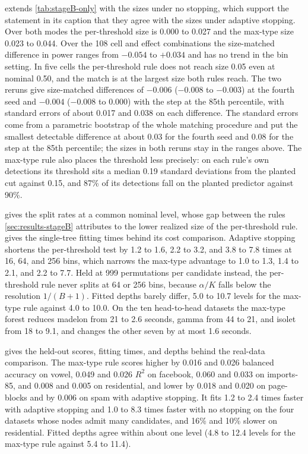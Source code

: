  extends \cref{tab:stageB-only} with the sizes under
no stopping, which support the statement in its caption that they agree with
the sizes under adaptive stopping. Over both modes the per-threshold size is
0.000 to 0.027 and the max-type size 0.023 to 0.044. Over the 108 cell and
effect combinations the size-matched difference in power ranges from $-0.054$
to $+0.034$ and has no trend in the bin setting. In five cells the
per-threshold rule does not reach size 0.05 even at nominal 0.50, and the match
is at the largest size both rules reach. The two reruns give size-matched
differences of $-0.006$ ($-0.008$ to $-0.003$) at the fourth seed and $-0.004$
($-0.008$ to $0.000$) with the step at the 85th percentile, with standard
errors of about 0.017 and 0.038 on each difference. The standard errors come
from a parametric bootstrap of the whole matching procedure and put the
smallest detectable difference at about 0.03 for the fourth seed and 0.08 for
the step at the 85th percentile; the sizes in both reruns stay in the ranges
above. The max-type rule also places the threshold less precisely: on each
rule's own detections its threshold sits a median 0.19 standard deviations
from the planted cut against 0.15, and 87\% of its detections fall on the
planted predictor against 90\%.

 gives the split rates at a common nominal level, whose
gap between the rules \cref{sec:results-stageB} attributes to the lower
realized size of the per-threshold rule.  gives the
single-tree fitting times behind its cost comparison. Adaptive stopping
shortens the per-threshold test by 1.2 to 1.6, 2.2 to 3.2, and 3.8 to 7.8
times at 16, 64, and 256 bins, which narrows the max-type advantage to 1.0 to
1.3, 1.4 to 2.1, and 2.2 to 7.7. Held at 999 permutations per candidate
instead, the per-threshold rule never splits at 64 or 256 bins, because
$\alpha/K$ falls below the resolution $1/(B+1)$. Fitted depths barely differ,
5.0 to 10.7 levels for the max-type rule against 4.0 to 10.0. On the ten
head-to-head datasets the max-type forest reduces madelon from 21 to 2.6
seconds, gamma from 44 to 21, and isolet from 18 to 9.1, and changes the other
seven by at most 1.6 seconds.

 gives the held-out scores, fitting times, and depths
behind the real-data comparison. The max-type rule scores higher by 0.016 and
0.026 balanced accuracy on vowel, 0.049 and 0.026 $R^2$ on facebook, 0.060 and
0.033 on imports-85, and 0.008 and 0.005 on residential, and lower by 0.018 and
0.020 on page-blocks and by 0.006 on spam with adaptive stopping. It fits 1.2
to 2.4 times faster with adaptive stopping and 1.0 to 8.3 times faster with no
stopping on the four datasets whose nodes admit many candidates, and 16\% and
10\% slower on residential. Fitted depths
agree within about one level (4.8 to 12.4 levels for the max-type rule against
5.4 to 11.4).

